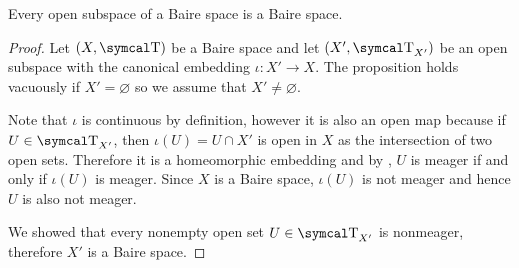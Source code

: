 \begin{proposition}\label{thm:open_subspace_of_baire_space_is_baire}
  Every open subspace of a Baire space is a Baire space.
\end{proposition}
\begin{proof}
  Let \( (X, \CT) \) be a Baire space and let \( (X', \CT_{X'}) \) be an open subspace with the canonical embedding \( \iota: X' \to X \). The proposition holds vacuously if \( X' = \varnothing \) so we assume that \( X' \neq \varnothing \).

  Note that \( \iota \) is continuous by definition, however it is also an open map because if \( U \in \CT_{X'} \), then \( \iota(U) = U \cap X' \) is open in \( X \) as the intersection of two open sets. Therefore it is a homeomorphic embedding and by , \( U \) is meager if and only if \( \iota(U) \) is meager. Since \( X \) is a Baire space, \( \iota(U) \) is not meager and hence \( U \) is also not meager.

  We showed that every nonempty open set \( U \in \CT_{X'} \) is nonmeager, therefore \( X' \) is a Baire space.
\end{proof}
